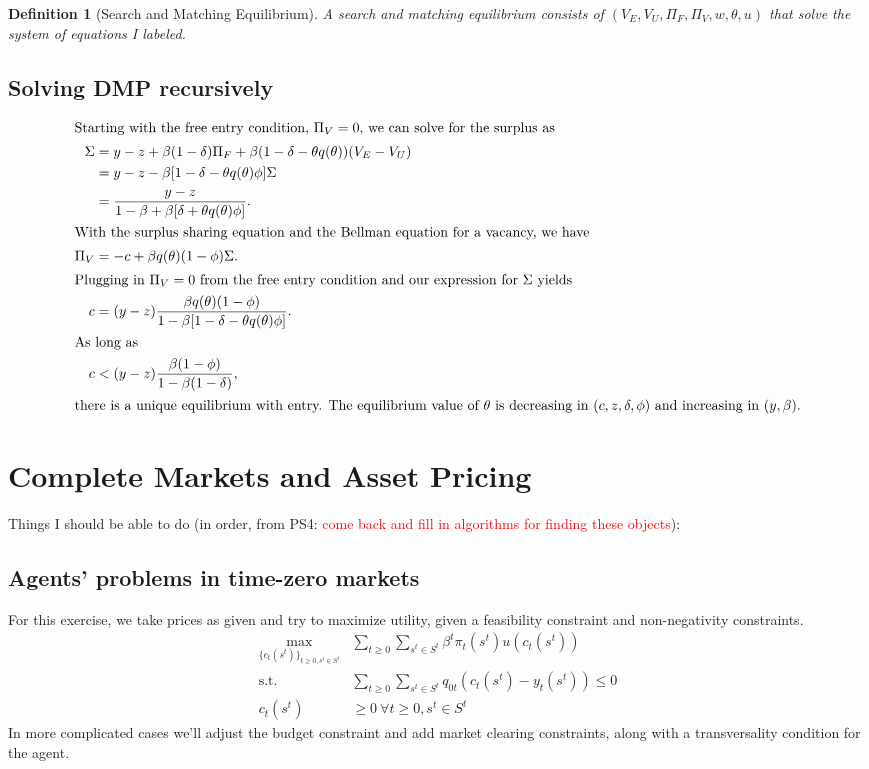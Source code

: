 \documentclass[11pt]{article}
\newtheorem*{definition}{Definition}
\newcommand{\rd}{\textcolor{red}}
\begin{document}
\begin{definition}[Search and Matching Equilibrium]
A search and matching equilibrium consists of $(V_E, V_U, \Pi_F, \Pi_V, w, \theta, u)$ that solve the system of equations I labeled.
\end{definition}

\subsection{Solving DMP recursively}
\label{sec:org5748580}
   \begin{align*}
\intertext{Starting with the free entry condition, $\Pi_V = 0$, we can solve for the surplus as}
\Sigma &= y - z + \beta (1 - \delta) \Pi_F + \beta (1 - \delta - \theta q(\theta)) (V_E - V_U)\\
&= y - z - \beta [1 - \delta - \theta q(\theta) \phi] \Sigma\\
&= \frac{y - z}{1 - \beta + \beta[\delta + \theta q(\theta) \phi]}.\\
\intertext{With the surplus sharing equation and the Bellman equation for a vacancy, we have}
\Pi_V &= -c + \beta q(\theta) (1 -\phi)\Sigma.\\
\intertext{Plugging in $\Pi_V = 0$ from the free entry condition and our expression for $\Sigma$ yields}
c &= (y - z) \frac{\beta q(\theta) (1 - \phi)}{1 - \beta[1 - \delta - \theta q(\theta) \phi]}.\\
\intertext{As long as}
c &< (y - z) \frac{\beta (1 - \phi)}{1 - \beta (1 - \delta)},\\
\intertext{there is a unique equilibrium with entry. The equilibrium value of $\theta$ is decreasing in $(c, z, \delta, \phi)$ and increasing in $(y, \beta)$.}
   \end{align*}

\section{Complete Markets and Asset Pricing}
\label{sec:org1c8d902}

Things I should be able to do (in order, from PS4: \rd{come back and fill in algorithms for finding these objects}):

\subsection{Agents' problems in time-zero markets}
\label{sec:org8c8f853}
For this exercise, we take prices as given and try to maximize utility, given a feasibility constraint and non-negativity constraints.
\begin{align*}
\max_{\{c_t (s^t)\}_{t \ge 0, s^t \in S^t}} & \sum_{t \ge 0} \sum_{s^t \in S^t} \beta^t \pi_t (s^t) u (c_t(s^t))\\
\text{s.t. } & \sum_{t \ge 0} \sum_{s^t \in S^t} q_{0t} (c_t (s^t) - y_t (s^t)) \le 0\\
c_t (s^t) &\ge 0 \ \forall t \ge 0, s^t \in S^t
\end{align*}
In more complicated cases we'll adjust the budget constraint and add market clearing constraints, along with a transversality condition for the agent.
\end{document}
